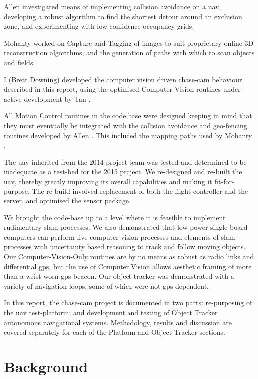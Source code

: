 \documentclass[a4paper, 11pt, titlepage]{article}
\begin{document}
    Allen \cite{Allen} investigated means of implementing collision avoidance on a \gls{uav}, developing a robust algorithm to find the shortest detour around an exclusion zone, and experimenting with low-confidence occupancy grids. 
    
    Mohanty \cite{Mohanty} worked on Capture and Tagging of images to suit proprietary online 3D reconstruction algorithms, and the generation of paths with which to scan objects and fields.

    I (Brett Downing) \cite{Downing} developed the computer vision driven chase-cam behaviour described in this report, using the optimised Computer Vision routines under active development by Tan \cite{Tan}.
    
    All Motion Control routines in the code base were designed keeping in mind that they must eventually be integrated with the collision avoidance and geo-fencing routines developed by Allen \cite{Allen}. This included the mapping paths used by Mohanty \cite{Mohanty}.

    The \gls{uav} inherited from the 2014 project team was tested and determined to be inadequate as a test-bed for the 2015 project. We re-designed and re-built the \gls{uav}, thereby greatly improving its overall capabilities and making it fit-for-purpose. The re-build involved replacement of both the flight controller and the server, and optimised the sensor package. 

    We brought the code-base up to a level where it is feasible to implement rudimentary \gls{slam} processes.  We also demonstrated that low-power single board computers can perform live computer vision processes and elements of \gls{slam} processes with uncertainty based reasoning to track and follow moving objects. Our Computer-Vision-Only routines are by no means as robust as radio links and differential \gls{gps}, but the use of Computer Vision allows aesthetic framing of more than a wrist-worn \gls{gps} beacon. Our object tracker was demonstrated with a variety of navigation loops, some of which were not \gls{gps} dependent.

    In this report, the chase-cam project is documented in two parts: re-purposing of the \gls{uav} test-platform; and development and testing of Object Tracker autonomous navigational systems. Methodology, results and discussion are covered separately for each of the Platform and Object Tracker sections.

  \section{Background}
\end{document}
